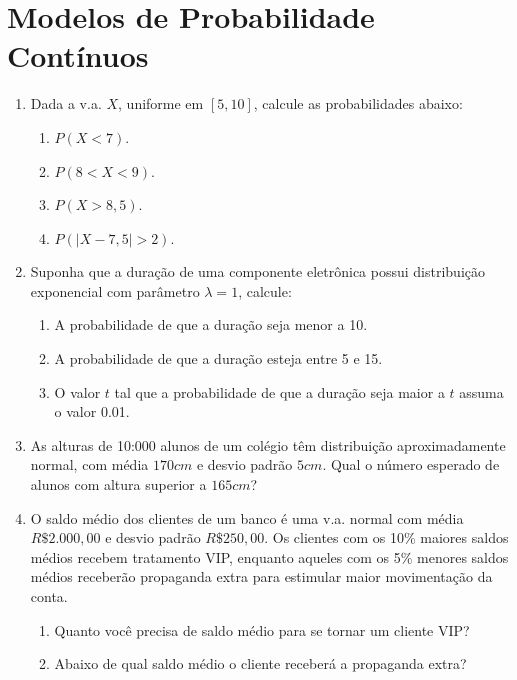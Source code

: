 \newpage
\section*{Modelos de Probabilidade Contínuos}
\begin{enumerate}
\item Dada a v.a. $X$, uniforme em $[5, 10]$, calcule as probabilidades abaixo:
	\begin{enumerate}[label=\alph*)]
		\item $P(X < 7)$.
		\item $P(8 < X < 9)$.
		\item $P(X > 8,5)$.
		\item $P(|X-7,5| > 2)$.
	\end{enumerate}

\setcounter{enumi}{2}
\item Suponha que a duração de uma componente eletrônica possui distribuição exponencial com parâmetro $\lambda = 1$, calcule:
	\begin{enumerate}[label=\alph*)]
		\item A probabilidade de que a duração seja menor a 10.
		\item A probabilidade de que a duração esteja entre 5 e 15.
		\item O valor $t$ tal que a probabilidade de que a duração seja maior a $t$ assuma o valor 0.01.
	\end{enumerate}

\item As alturas de 10:000 alunos de um colégio têm distribuição aproximadamente normal, com média $170cm$ e desvio padrão $5cm$. Qual o número esperado de alunos com altura superior a $165cm$?

\setcounter{enumi}{10}
\item O saldo médio dos clientes de um banco é uma v.a. normal com média $R\$ 2.000,00$ e desvio padrão $R\$ 250,00$. Os clientes com os 10\% maiores saldos médios recebem tratamento VIP, enquanto aqueles com os 5\% menores saldos médios receberão propaganda extra para estimular maior movimentação da conta.
	\begin{enumerate}[label=\alph*)]
		\item Quanto você precisa de saldo médio para se tornar um cliente VIP?
		\item Abaixo de qual saldo médio o cliente receberá a propaganda extra?
	\end{enumerate}
\end{enumerate}



